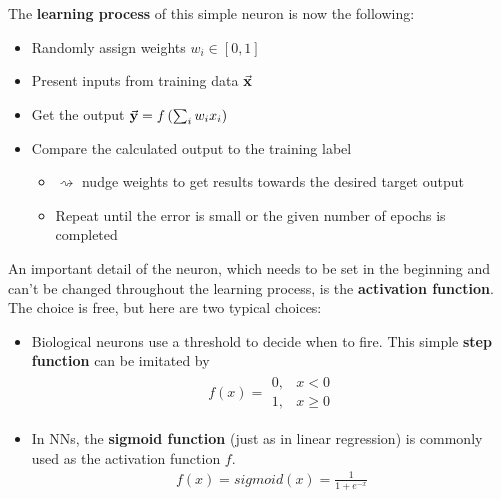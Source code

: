 The \textbf{learning process} of this simple neuron is now the following:
\begin{itemize}
  \item Randomly assign weights $w_i \in [0,1]$
  \item Present inputs from training data $\vec{\mathbf{x}}$
  \item Get the output $\vec{\mathbf{y}} = f\left(\sum_i w_i x_i\right)$
  \item Compare the calculated output to the training label
  \begin{itemize}
    \item $\rightsquigarrow$ nudge weights to get results towards the desired target output
    \item Repeat until the error is small or the given number of epochs is completed
  \end{itemize}
\end{itemize}

An important detail of the neuron, which needs to be set in the beginning and can't be changed throughout the learning process, is the \textbf{activation function}. The choice is free, but here are two typical choices:
\begin{itemize}
  \item Biological neurons use a threshold to decide when to fire. This simple \textbf{step function} can be imitated by
  \begin{align*}
    f(x) = \begin{array}{ll}
      0,&x<0\\1,&x\geq0
    \end{array}
  \end{align*}
  \item In NNs, the \textbf{sigmoid function} (just as in linear regression) is commonly used as the activation function $f$.
  \begin{align*}
    f(x) = sigmoid(x) = \frac{1}{1+e^{-x}}
  \end{align*}
\end{itemize}

